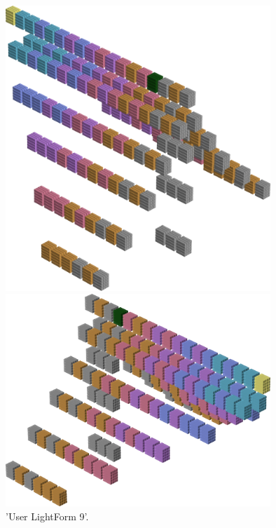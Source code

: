 %
\begin{minipage}[b]{0.48\linewidth}
\begin{figure}[H]
    \centering
    \begin{adjustbox}{width=4cm,margin=0cm 0cm}
      \includegraphics[width=10cm]{src/colorspace_patterns/pattern17-45.png}%
    \end{adjustbox}
    \begin{adjustbox}{width=4cm,margin=0cm 0cm}
      \includegraphics[width=10cm]{src/colorspace_patterns/pattern17-225.png}%
    \end{adjustbox}
\caption{'User LightForm 9'.}
\end{figure}
\end{minipage}
